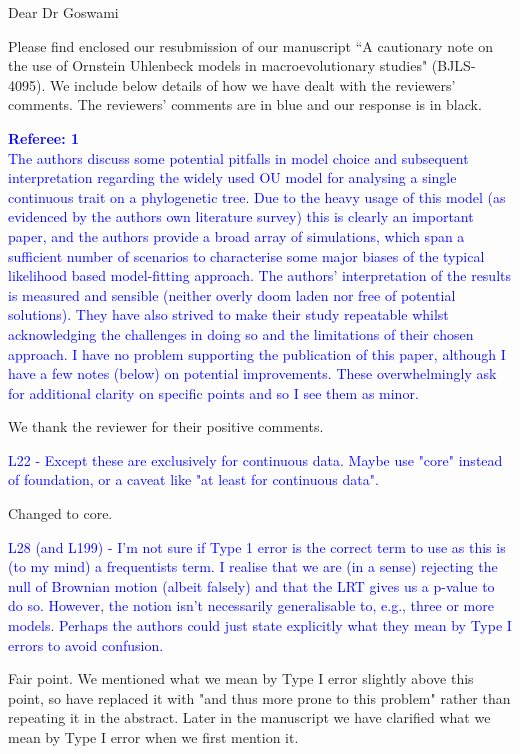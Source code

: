\documentclass[12pt]{letter}
\begin{document}
\begin{letter}{}
\opening{Dear Dr Goswami}

Please find enclosed our resubmission of our manuscript ``A cautionary note on the use of Ornstein Uhlenbeck models in macroevolutionary studies" (BJLS-4095). We include below details of how we have dealt with the reviewers' comments. The reviewers' comments are in blue and our response is in black.


\textcolor{blue}{\textbf{Referee: 1}\\
The authors discuss some potential pitfalls in model choice and subsequent interpretation regarding the widely used OU model for analysing a single continuous trait on a phylogenetic tree. Due to the heavy usage of this model (as evidenced by the authors own literature survey) this is clearly an important paper, and the authors provide a broad array of simulations, which span a sufficient number of scenarios to characterise some major biases of the typical likelihood based model-fitting approach. The authors' interpretation of the results is measured and sensible (neither overly doom laden nor free of potential solutions). They have also strived to make their study repeatable whilst acknowledging the challenges in doing so and the limitations of their chosen approach. I have no problem supporting the publication of this paper, although I have a few notes (below) on potential improvements. These overwhelmingly ask for additional clarity on specific points and so I see them as minor.}

We thank the reviewer for their positive comments. 

\textcolor{blue}{L22 - Except these are exclusively for continuous data. Maybe use "core" instead of foundation, or a caveat like "at least for continuous data".}

Changed to core.

\textcolor{blue}{L28 (and L199) - I'm not sure if Type 1 error is the correct term to use as this is (to my mind) a frequentists term. I realise that we are (in a sense) rejecting the null of Brownian motion (albeit falsely) and that the LRT gives us a p-value to do so. However, the notion isn't necessarily generalisable to, e.g., three or more models. Perhaps the authors could just state explicitly what they mean by Type I errors to avoid confusion.}

Fair point. We mentioned what we mean by Type I error slightly above this point, so have replaced it with "and thus more prone to this problem" rather than repeating it in the abstract. Later in the manuscript we have clarified what we mean by Type I error when we first mention it.


\end{letter}
\end{document}
